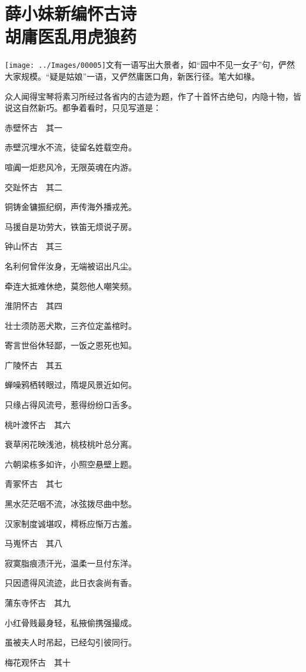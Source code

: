 
\chapter{薛小妹新编怀古诗\\胡庸医乱用虎狼药}

{\texttt{[image: ../Images/00005]}\kaishu 文有一语写出大景者，如``园中不见一女子''句，俨然大家规模。``疑是姑娘''一语，又俨然庸医口角，新医行径。笔大如椽。}

众人闻得宝琴将素习所经过各省内的古迹为题，作了十首怀古绝句，内隐十物，皆说这自然新巧。都争着看时，只见写道是：

赤壁怀古　其一

赤壁沉埋水不流，徒留名姓载空舟。

喧阗一炬悲风冷，无限英魂在内游。

交趾怀古　其二

铜铸金镛振纪纲，声传海外播戎羌。

马援自是功劳大，铁笛无烦说子房。

钟山怀古　其三

名利何曾伴汝身，无端被诏出凡尘。

牵连大抵难休绝，莫怨他人嘲笑频。

淮阴怀古　其四

壮士须防恶犬欺，三齐位定盖棺时。

寄言世俗休轻鄙，一饭之恩死也知。

广陵怀古　其五

蝉噪鸦栖转眼过，隋堤风景近如何。

只缘占得风流号，惹得纷纷口舌多。

桃叶渡怀古　其六

衰草闲花映浅池，桃枝桃叶总分离。

六朝梁栋多如许，小照空悬壁上题。

青冢怀古　其七

黑水茫茫咽不流，冰弦拨尽曲中愁。

汉家制度诚堪叹，樗栎应惭万古羞。

马嵬怀古　其八

寂寞脂痕渍汗光，温柔一旦付东洋。

只因遗得风流迹，此日衣衾尚有香。

蒲东寺怀古　其九

小红骨贱最身轻，私掖偷携强撮成。

虽被夫人时吊起，已经勾引彼同行。

梅花观怀古　其十


